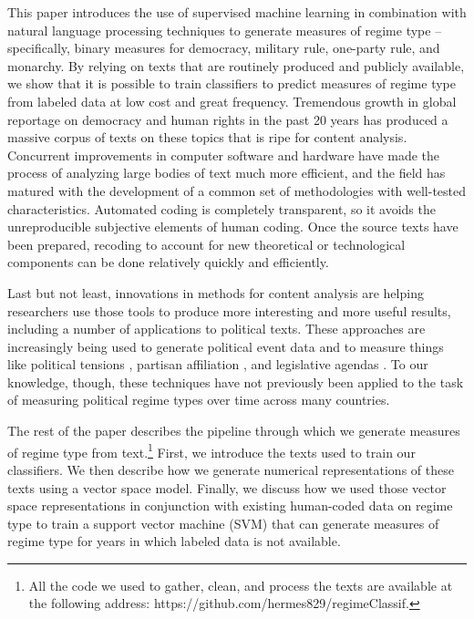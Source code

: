 \documentclass[pdftex,12pt,fullpage,oneside]{amsart}
\begin{document}
This paper introduces the use of supervised machine learning in combination with natural language processing techniques to generate measures of regime type -- specifically, binary measures for democracy, military rule, one-party rule, and monarchy. By relying on texts that are routinely produced and publicly available, we show that it is possible to train classifiers to predict measures of regime type from labeled data at low cost and great frequency. Tremendous growth in global reportage on democracy and human rights in the past 20 years has produced a massive corpus of texts on these topics that is ripe for content analysis. Concurrent improvements in computer software and hardware have made the process of analyzing large bodies of text much more efficient, and the field has matured with the development of a common set of methodologies with well-tested characteristics. Automated coding is completely transparent, so it avoids the unreproducible subjective elements of human coding. Once the source texts have been prepared, recoding to account for new theoretical or technological components can be done relatively quickly and efficiently. 

Last but not least, innovations in methods for content analysis are helping researchers use those tools to produce more interesting and more useful results, including a number of applications to political texts. These approaches are increasingly being used to generate political event data \citep{dorazio:etal:2014,king:lowe:2003,oconnor:etal:2013} and to measure things like political tensions \citep{chadefaux:2014}, partisan affiliation \citep{lo:etal:2014,yu:etal:2008,laver:etal:2003}, and legislative agendas \citep{grimmer:2010}. To our knowledge, though, these techniques have not previously been applied to the task of measuring political regime types over time across many countries. 

The rest of the paper describes the pipeline through which we generate measures of regime type from text.\footnote{All the code we used to gather, clean, and process the texts are available at the following address: https://github.com/hermes829/regimeClassif.} First, we introduce the texts used to train our classifiers. We then describe how we generate numerical representations of these texts using a vector space model. Finally, we discuss how we used those vector space representations in conjunction with existing human-coded data on regime type to train a support vector machine (SVM) that can generate measures of regime type for years in which labeled data is not available.
\end{document}
